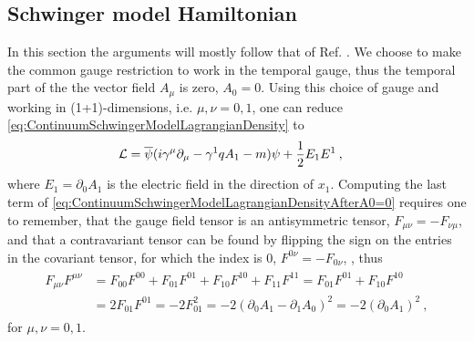 \documentclass[../main.tex]{subfiles} %
\begin{document}
\subsection{Schwinger model Hamiltonian} \label{sec:ContinuumSchwingerModelHamiltonianDensity}

In this section the arguments will mostly follow that of Ref. \cite{melnikov_latticeSchwingerModel_2000}. We choose to make the common gauge restriction to work in the temporal gauge, thus the temporal part of the the vector field $A_\mu$ is zero, $A_0 = 0$. Using this choice of gauge and working in (1+1)-dimensions, i.e. $\mu,\nu = 0,1$, one can reduce \cref{eq:ContinuumSchwingerModelLagrangianDensity} to
\begin{align} \label{eq:ContinuumSchwingerModelLagrangianDensityAfterA0=0}
    \mathcal{L} &= \overline{\psi} (i \gamma^\mu \partial_\mu - \gamma^1 q A_1 - m) \psi + \frac{1}{2}E_1E^1 \: ,
\end{align}
where $E_1 = \partial_0 A_1$ is the electric field in the direction of $x_1$. Computing the last term of \cref{eq:ContinuumSchwingerModelLagrangianDensityAfterA0=0} requires one to remember, that the gauge field tensor is an antisymmetric tensor, $F_{\mu\nu} = - F_{\nu\mu}$, and that a contravariant tensor can be found by flipping the sign on the entries in the covariant tensor, for which the index is $0$, $F^{0\nu} = -F_{0\nu}$, \cite{griffiths_introToEldyn_2017}, thus
\begin{align}
\begin{split}
    F_{\mu\nu}F^{\mu\nu} &= F_{00}F^{00} + F_{01}F^{01} + F_{10}F^{10} + F_{11}F^{11}     = F_{01}F^{01} + F_{10}F^{10} \\
        &= 2F_{01}F^{01}
        = -2F_{01}^2
        = -2(\partial_0A_1 - \partial_1A_0)^2
        = -2(\partial_0A_1)^2 \: ,
\end{split}
\end{align}
for $\mu,\nu = 0,1$.
\end{document}
